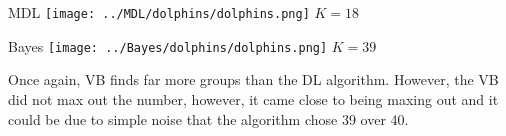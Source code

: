 \begin{minipage}{0.45\linewidth}
MDL
\centering
\texttt{[image: ../MDL/dolphins/dolphins.png]}
$K=18$

\end{minipage}
\begin{minipage}{0.45\linewidth}
Bayes
\centering
\texttt{[image: ../Bayes/dolphins/dolphins.png]}
$K=39$
\end{minipage}
\vspace{10pt}

Once again, VB finds far more groups than the DL algorithm. However, the VB
did not max out the number, however, it came close to being maxing out and
it could be due to simple noise that the algorithm chose 39 over 40.
